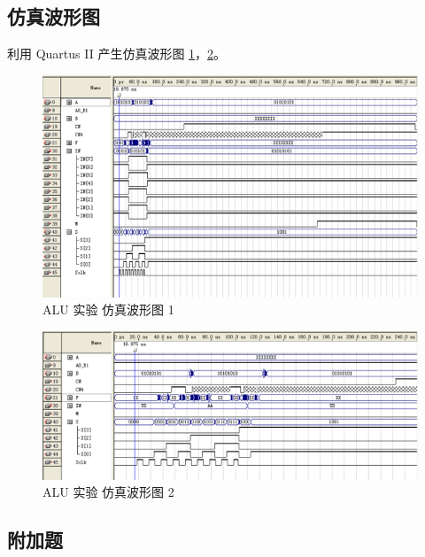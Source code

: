 \subsection{仿真波形图}

利用 Quartus II 产生仿真波形图 \ref{fig:wave3_1}，\ref{fig:wave3_2}。

\begin{figure}[H]
\centering
\includegraphics[width=\textwidth]{images/wave3_1.png}
\caption{ALU 实验 仿真波形图 1}
\label{fig:wave3_1}
\end{figure}

\begin{figure}[H]
\centering
\includegraphics[width=\textwidth]{images/wave3_2.png}
\caption{ALU 实验 仿真波形图 2}
\label{fig:wave3_2}
\end{figure}


\subsection{附加题}


